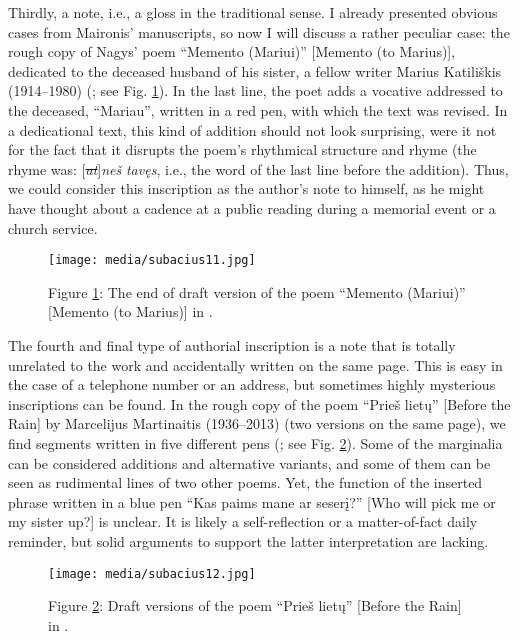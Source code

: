 \documentclass{article}
\begin{document}
Thirdly, a note, i.e., a gloss in the traditional sense. I already presented obvious cases from Maironis' manuscripts, so now I will discuss a rather
peculiar case: the rough copy of Nagys' poem ``Memento (Mariui)''
{[}Memento (to Marius){]}, dedicated to the deceased husband of his
sister, a fellow writer Marius Katiliškis (1914--1980) (\citealt[20v]{nagys_memento_1980};
see Fig. \ref{fig:subacius11}). In the last line, the poet adds a vocative addressed to
the deceased, ``Mariau'', written in a red pen, with which the text was
revised. In a dedicational text, this kind of addition should not look
surprising, were it not for the fact that it disrupts the poem's
rhythmical structure and rhyme (the rhyme was:
{[}\emph{\sout{at}}{]}\emph{neš} \textbar{} \emph{tavęs}, i.e., the word
of the last line before the addition). Thus, we could consider this
inscription as the author's note to himself, as he might have thought
about a cadence at a public reading during a memorial event or a church
service.

\begin{figure}[!p]
    \centering
    \texttt{[image: media/subacius11.jpg]}
    \caption{Figure \ref{fig:subacius11}: The end of draft version of the poem ``Memento (Mariui)'' {[}Memento (to Marius){]} in \citealt[20v]{nagys_memento_1980}.}
    \label{fig:subacius11}
\end{figure}

The fourth and final type of authorial inscription is a note that is totally unrelated to the work and accidentally
written on the same page. This is easy in the case of a telephone number
or an address, but sometimes highly mysterious inscriptions can be
found. In the rough copy of the poem ``Prieš lietų'' {[}Before the
Rain{]} by Marcelijus Martinaitis (1936--2013) (two versions on the same
page), we find segments written in five different pens (\citealt{martinaitis_pries_1967}; see Fig. \ref{fig:subacius12}). Some of the marginalia can be considered additions
and alternative variants, and some of them can be seen as rudimental
lines of two other poems. Yet, the function of the inserted phrase
written in a blue pen ``Kas paims mane ar seserį?'' {[}Who will pick me
or my sister up?{]} is unclear. It is likely a self-reflection or a
matter-of-fact daily reminder, but solid arguments to support the latter
interpretation are lacking.

\begin{figure}[H]
    \centering
    \texttt{[image: media/subacius12.jpg]}
    \caption{Figure \ref{fig:subacius12}: Draft versions of the poem ``Prieš lietų'' {[}Before the
Rain{]} in \cite[17r]{martinaitis_pries_1967}.}
    \label{fig:subacius12}
\end{figure}
\end{document}
